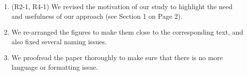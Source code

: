 \begin{enumerate}
\item (R2-1, R4-1)  We revised the motivation of our study to highlight the need and usefulness of our approach (see Section 1 on Page 2). 
\item We re-arranged the figures to make them close to the corresponding text, and also fixed several naming issues. 
  \item We proofread the paper thoroughly to make sure that there is no more language or formatting issue. 
\end{enumerate}


